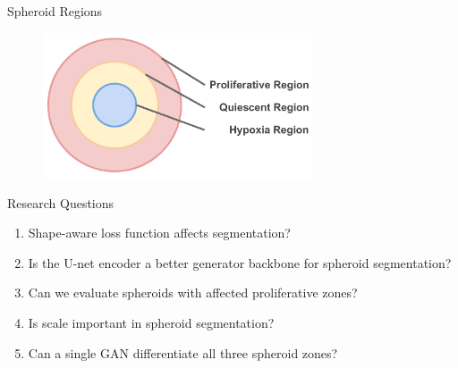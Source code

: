 \begin{frame}{Spheroid Regions}
    \begin{figure}
        \centering
        \includegraphics[width=8cm]{figures/introduction/spheroid_regions}
        \label{fig:spheroid_regions}
    \end{figure}
\end{frame}

\begin{frame}{Research Questions}
        \begin{enumerate}
            \item<1-> Shape-aware loss function \alert{affects} segmentation?
            \item<2-> Is the U-net encoder a \alert{better} generator backbone for spheroid segmentation?
            \item<3-> Can we evaluate spheroids with \alert{affected} proliferative zones?
            \item<4-> Is \alert{scale} important in spheroid segmentation?
            \item<5-> Can a single GAN differentiate \alert{all three} spheroid zones?
        \end{enumerate}
\end{frame}


